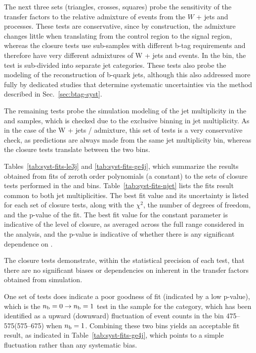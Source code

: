 The next three sets (triangles, crosses, squares) probe the
sensitivity of the transfer factors to the relative admixture of
events from the $W$ + jets and \ttbar processes. These tests are
conservative, since by construction, the admixture changes little when
translating from the \mj control region to the signal region, whereas the 
closure tests use sub-samples with different b-tag requirements and 
therefore have very different admixtures of W + jets and \ttbar events.  
In the \njetlow bin, the test is sub-divided into separate jet categories.
These tests also probe the modeling of the reconstruction of b-quark jets, 
although this also addressed more fully by dedicated studies that 
determine systematic uncertainties via the method described in
Sec.~\ref{sec:btag-syst}.

The remaining tests probe the simulation modeling of
the jet multiplicity in the \mj and \gj samples, which is checked due 
to the exclusive binning in jet multiplicity. As in the case of the 
W + jets / \ttbar admixture, this set of tests  is a very conservative
 check, as predictions are always made from the same jet multiplicity bin,
whereas the closure tests translate between the two bins.

Tables~\ref{tab:syst-fits-le3j} and \ref{tab:syst-fits-ge4j}, which
summarize the results obtained from fits of zeroth order polynomials
(\ie a constant) to the sets of closure tests performed in the \njetlow 
and \njethigh bins.  Table~\ref{tab:syst-fits-njet} lists the fits result
common to both jet multiplicities. The best fit value and its uncertainty
is listed for each set of closure tests, along with the $\chi^{2}$, the number
of degrees of freedom, and the p-value of the fit. The best fit value
for the constant parameter is indicative of the level of closure, as
averaged across the full \scalht range considered in the analysis, and
the p-value is indicative of whether there is any significant
dependence on \scalht. 

The closure tests demonstrate, within the statistical precision 
of each test, that there are no significant biases or dependencies on 
\scalht inherent in the transfer factors obtained from simulation.  

One set of tests does indicate a poor goodness of fit (indicated by a
low p-value), which is the $n_{\text{b}} = 0 \rightarrow n_{\text{b}} = 1$ test in the \mj
sample for the \njethigh category, which has been identified as a
upward (downward) fluctuation of event counts in the \scalht bin
475--575\gev (575--675\gev) when $n_{\text{b}} = 1$. Combining these two bins
yields an acceptable fit result, as indicated in
Table~\ref{tab:syst-fits-ge4j}, which points to a simple fluctuation
rather than any systematic bias.



